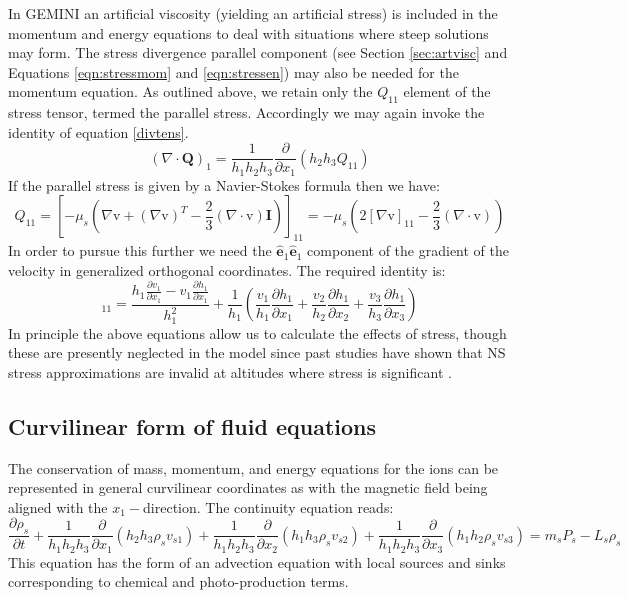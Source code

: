 \documentclass[11pt,letterpaper]{article}
\begin{document}
In GEMINI an artificial viscosity (yielding an artificial stress) is included in the momentum and energy equations to deal with situations where steep solutions may form.  The stress divergence parallel component (see Section \ref{sec:artvisc} and Equations \ref{eqn:stressmom} and \ref{eqn:stressen}) may also be needed for the momentum equation.  As outlined above, we retain only the $Q_{11}$ element of the stress tensor, termed the parallel stress.  Accordingly we may again invoke the identity of equation \ref{divtens}.
\begin{equation}
(\nabla \cdot \mathbf{Q})_1 = \frac{1}{h_1 h_2 h_3} \frac{\partial}{\partial x_1}(h_2 h_3 Q_{11})
\end{equation}
If the parallel stress is given by a Navier-Stokes formula then we have:
\begin{equation}
Q_{11} = \left[-\mu_s \left( \nabla \boldsymbol{\mathrm{v}} + (\nabla \boldsymbol{\mathrm{v}})^T - \frac{2}{3} (\nabla \cdot \boldsymbol{\mathrm{v}}) \mathbf{I} \right) \right]_{11} = -\mu_s \left( 2 [\nabla \boldsymbol{\mathrm{v}}]_{11} - \frac{2}{3} (\nabla \cdot \boldsymbol{\mathrm{v}}) \right)
\end{equation}
In order to pursue this further we need the $\hat{\mathbf{e}}_1 \hat{\mathbf{e}}_1$ component of the gradient of the velocity in generalized orthogonal coordinates.  The required identity is:
\begin{equation}
[\nabla \boldsymbol{\mathrm{v}}]_{11} = \frac{h_1 \frac{\partial v_1}{\partial x_1} - v_1 \frac{\partial h_1}{\partial x_1}}{h_1^2} + \frac{1}{h_1} \left( \frac{v_1}{h_1} \frac{\partial h_1}{\partial x_1} + \frac{v_2}{h_2} \frac{\partial h_1}{\partial x_2} + \frac{v_3}{h_3} \frac{\partial h_1}{\partial x_3} \right)
\end{equation}
In principle the above equations allow us to calculate the effects of stress, though these are presently neglected in the model since past studies have shown that NS stress approximations are invalid at altitudes where stress is significant \citep{Schunk:1975}.


\subsection{Curvilinear form of fluid equations}

The conservation of mass, momentum, and energy equations for the ions can be represented in general curvilinear coordinates as with the magnetic field being aligned with the $x_1-$direction.  The continuity equation reads: 
\begin{equation}
\frac{\partial \rho_s}{\partial t} + \frac{1}{h_1 h_2 h_3} \frac{\partial}{\partial x_1} \left( h_2 h_3 \rho_s v_{s1} \right) + \frac{1}{h_1 h_2 h_3} \frac{\partial}{\partial x_2} \left( h_1 h_3 \rho_s v_{s2} \right) + \frac{1}{h_1 h_2 h_3} \frac{\partial}{\partial x_3} \left( h_1 h_2 \rho_s v_{s3} \right) =  m_s P_s - L_s \rho_s \label{eqn:continuitycoord}
\end{equation}
This equation has the form of an advection equation with local sources and sinks corresponding to chemical and photo-production terms.
\end{document}
